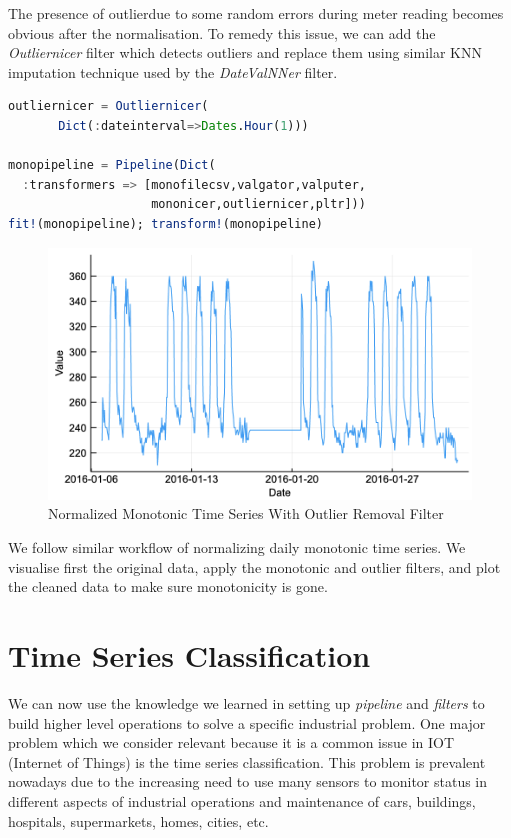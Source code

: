 \documentclass{juliacon}
\begin{document}
The presence of outlierdue to some random errors during meter reading  becomes obvious after the normalisation. To remedy this issue, we can add the \emph{Outliernicer} filter which detects outliers and replace them using similar KNN imputation technique used by the \emph{DateValNNer} filter.

\begin{lstlisting}[language = Julia]
outliernicer = Outliernicer(
       Dict(:dateinterval=>Dates.Hour(1)))

monopipeline = Pipeline(Dict(
  :transformers => [monofilecsv,valgator,valputer,
                    mononicer,outliernicer,pltr]))
fit!(monopipeline); transform!(monopipeline)
\end{lstlisting}

\begin{figure}[htbp]
   \centering
   \includegraphics[width=\columnwidth]{outnicer.png} %
   \caption{Normalized Monotonic Time Series With Outlier Removal Filter}
   \label{fig:outnicer}
\end{figure}

We follow similar workflow of normalizing daily monotonic time series. We visualise first the original data, apply the monotonic and outlier filters, and plot the cleaned data to make sure monotonicity is gone.



\section{Time Series Classification}

We can now use the knowledge we learned in setting up 
\emph{pipeline} and \emph{filters} to build higher level
operations to solve a specific industrial problem. One major problem
which we consider relevant because it is a common issue in IOT (Internet of Things) 
 is the time series classification. This problem is prevalent nowadays 
due to the increasing need to use many sensors to monitor status in different aspects of industrial
operations and maintenance of cars, buildings, hospitals, supermarkets, homes, cities, etc.
\end{document}
